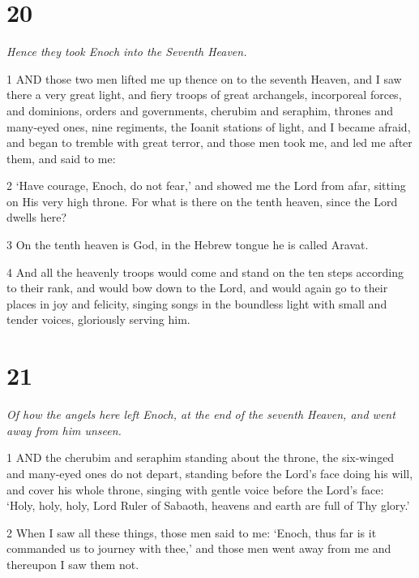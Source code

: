 \chapter{20}

\par \textit{Hence they took Enoch into the Seventh Heaven.}

\par 1 AND those two men lifted me up thence on to the seventh Heaven, and I saw there a very great light, and fiery troops of great archangels, incorporeal forces, and dominions, orders and governments, cherubim and seraphim, thrones and many-eyed ones, nine regiments, the Ioanit stations of light, and I became afraid, and began to tremble with great terror, and those men took me, and led me after them, and said to me:

\par 2 ‘Have courage, Enoch, do not fear,’ and showed me the Lord from afar, sitting on His very high throne. For what is there on the tenth heaven, since the Lord dwells here?

\par 3 On the tenth heaven is God, in the Hebrew tongue he is called Aravat.

\par 4 And all the heavenly troops would come and stand on the ten steps according to their rank, and would bow down to the Lord, and would again go to their places in joy and felicity, singing songs in the boundless light with small and tender voices, gloriously serving him.

\chapter{21}

\par \textit{Of how the angels here left Enoch, at the end of the seventh Heaven, and went away from him unseen.}

\par 1 AND the cherubim and seraphim standing about the throne, the six-winged and many-eyed ones do not depart, standing before the Lord's face doing his will, and cover his whole throne, singing with gentle voice before the Lord's face: ‘Holy, holy, holy, Lord Ruler of Sabaoth, heavens and earth are full of Thy glory.’

\par 2 When I saw all these things, those men said to me: ‘Enoch, thus far is it commanded us to journey with thee,’ and those men went away from me and thereupon I saw them not.

